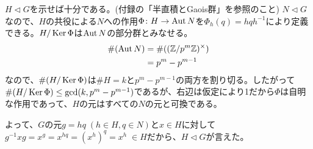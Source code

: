 \newpage





\subsubsection{} %
\begin{sol}
  $H \lhd G$を示せば十分である。(付録の「半直積とGaois群」を参照のこと) $N \lhd G$なので、$H$の共役による$N$への作用$\Phi \colon H \rightarrow \operatorname{Aut} N$を$\Phi_h(q)=hqh^{-1}$により定義できる。$H / \operatorname{Ker} \Phi$は$\operatorname{Aut} N$の部分群とみなせる。
  \begin{align*}
    \#(\operatorname{Aut} N) &= \#(({\mathbb Z}/ p^m {\mathbb Z})^{\times}) \\
    &= p^m - p^{m-1}
  \end{align*}
  なので、$\#(H / \operatorname{Ker} \Phi)$は$\# H= k$と$ p^m - p^{m-1}$の両方を割り切る。したがって$\#(H / \operatorname{Ker} \Phi) \leq \gcd (k,p^m - p^{m-1})$であるが、右辺は仮定により1だから$\Phi$は自明な作用であって、$H$の元はすべての$N$の元と可換である。

  よって、$G$の元$g=hq \; (h \in H, q \in N)$と$x \in H$に対して$g^{-1}xg = x^g =x^{hq} = (x^h)^q = x^h \; \in H$だから、$H \lhd G$が言えた。
\end{sol}

\newpage


